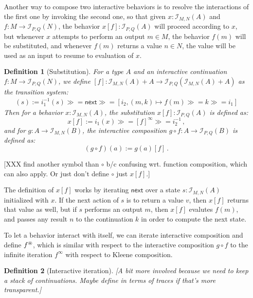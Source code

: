 \documentclass{article}
\newtheorem{definition}{Definition}
\newcommand{\kw}[1]{\ensuremath{ \mathsf{#1} }}
\newcommand{\bind}{\gg\!\!=}
\begin{document}
Another way to compose two interactive behaviors
is to resolve the interactions of the first one
by invoking the second one,
so that given
$x : \mathcal{I}_{M,N}(A)$ and
$f : M \rightarrow \mathcal{I}_{P,Q}(N)$,
the behavior $x[f] : \mathcal{I}_{P,Q}(A)$
will proceed according to $x$,
but whenever $x$ attempts to perform an output $m \in M$,
the behavior $f(m)$ will be substituted,
and whenever $f(m)$ returns a value $n \in N$,
the value will be used as an input to resume to evaluation of $x$.

\begin{definition}[Substitution]
For a type $A$ and
an interactive continuation $f : M \rightarrow \mathcal{I}_{P,Q}(N)$,
we define
$[f] : \mathcal{I}_{M,N}(A) + A \rightarrow
 \mathcal{I}_{P,Q}(\mathcal{I}_{M,N}(A) + A)$
as the transition system:
\begin{align*}
  [f](s) := i_1^{-1}(s) \bind \kw{next} \bind
      [i_2, (m, k) \mapsto f(m) \bind k \bind i_1]
\end{align*}
Then for a behavior $x : \mathcal{I}_{M,N}(A)$,
the \emph{substitution} $x[f] : \mathcal{I}_{P,Q}(A)$ is defined as:
\[
    x[f] := i_1(x) \bind [f]^\infty \bind i_2^{-1} \,,
\]
and for $g : A \rightarrow \mathcal{I}_{M,N}(B)$,
the \emph{interactive composition}
$g \circ f : A \rightarrow \mathcal{I}_{P,Q}(B)$ is defined as:
\[
    (g \circ f)(a) := g(a) [f] \,.
\]
\end{definition}

[XXX find another symbol than $\circ$ b/c confusing
wrt. function composition, which can also apply.
Or just don't define $\circ$ just $x[f]$.]

The definition of $x[f]$ works by iterating $\kw{next}$
over a state $s : \mathcal{I}_{M,N}(A)$ initialized with $x$.
If the next action of $s$ is to return a value $v$,
then $x[f]$ returns that value as well,
but if $s$ performs an output $m$,
then $x[f]$ evalutes $f(m)$,
and passes any result $n$ to the continuation $k$
in order to compute the next state.

To let a behavior interact with itself,
we can iterate interactive composition and
define $f^\oast$,
which is similar with respect to the interactive composition $g \circ f$
to the infinite iteration $f^\infty$ with respect to Kleene composition.

\begin{definition}[Interactive iteration]
[A bit more involved because we need to keep a stack of continuations.
Maybe define in terms of traces if that's more transparent.]
\end{definition}
\end{document}

